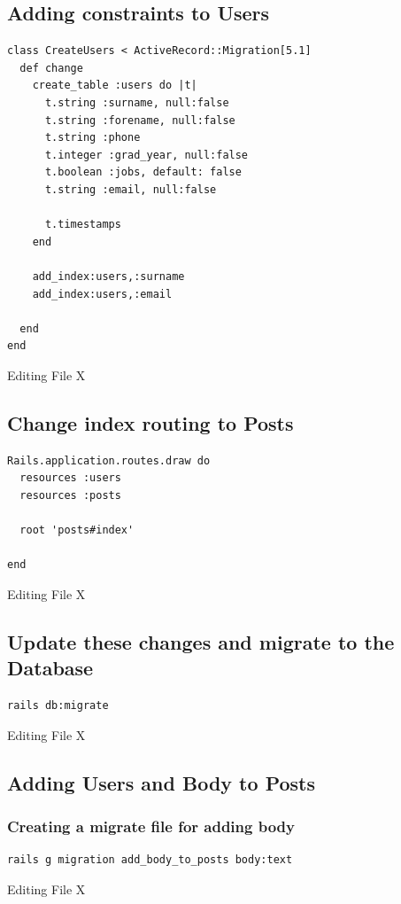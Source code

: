 \documentclass[a4paper]{article}
\begin{document}
\subsection{Adding constraints to Users}
\label{sec-2-3}
\begin{listing}[H]
\begin{verbatim}
class CreateUsers < ActiveRecord::Migration[5.1]
  def change
    create_table :users do |t|
      t.string :surname, null:false
      t.string :forename, null:false
      t.string :phone
      t.integer :grad_year, null:false
      t.boolean :jobs, default: false
      t.string :email, null:false

      t.timestamps
    end

    add_index:users,:surname
    add_index:users,:email

  end
end
\end{verbatim}
\caption{Editing File X}
\end{listing}

\subsection{Change index routing to Posts}
\label{sec-2-4}
\begin{listing}[H]
\begin{verbatim}
Rails.application.routes.draw do
  resources :users
  resources :posts

  root 'posts#index'

end
\end{verbatim}
\caption{Editing File X}
\end{listing}

\subsection{Update these changes and migrate to the Database}
\label{sec-2-5}
\begin{listing}[H]
\begin{verbatim}
rails db:migrate
\end{verbatim}
\caption{Editing File X}
\end{listing}

\subsection{Adding Users and Body to Posts}
\label{sec-2-6}

\subsubsection{Creating a migrate file for adding body}
\label{sec-2-6-1}
\begin{listing}[H]
\begin{verbatim}
rails g migration add_body_to_posts body:text
\end{verbatim}
\caption{Editing File X}
\end{listing}
\end{document}
